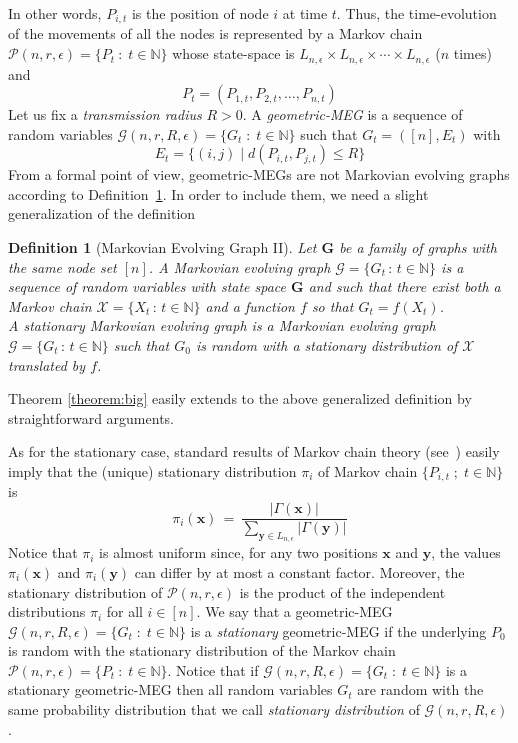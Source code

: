 \documentclass[10pt,a4paper]{article}
\newtheorem{definition}{Definition}[section]
\begin{document}
In other words, $P_{i,t}$ is the position of node $i$ at time $t$. Thus, the time-evolution of the movements of all the nodes is represented by a Markov chain $\mathcal{P}(n, r, \epsilon) = \{P_t \: :\; t\in \mathbb{N} \}$ whose state-space is $L_{n,\epsilon}\times L_{n,\epsilon}\times \cdots \times L_{n,\epsilon}$ ($n$ times) and
$$
P_t  = (P_{1,t}, P_{2,t},\ldots, P_{n, t})
$$
Let us fix a \emph{transmission radius} $R > 0$. A \emph{geometric-MEG} is a sequence of random
variables $\mathcal{G}(n, r, R, \epsilon) = \{ G_t \;:\; t \in \mathbb{N}\}$ such that $G_t = ([n],
E_t)$ with
$$
E_t = \{ (i, j) \;|\; d(P_{i, t}, P_{j, t}) \leqslant R\}
$$
From a formal point of view, geometric-MEGs are not Markovian evolving graphs according to Definition~\ref{def:genmg}. In order to include them, we  need a slight generalization of the definition


\begin{definition}[Markovian Evolving  Graph II]\label{def:genmg}
Let $\mathbf{G}$ be a family of graphs with the same node set $[n]$. A \emph{Markovian evolving  graph} $\mathcal{G} =  \{ G_t \,:\, t \in \mathbb{N} \} $ is a sequence of random variables with state space $\mathbf{G}$ and such that there exist both  a Markov chain $\mathcal{X} =  \{ X_t \,:\, t \in \mathbb{N} \}$ and a function $f$ so that $G_t = f(X_t )$. \\
A \emph{stationary} Markovian evolving  graph is a Markovian evolving graph $\mathcal{G} = \{ G_t \,:\, t \in \mathbb{N} \}$ such that $G_0$ is random with a stationary distribution of $\mathcal{X}$ translated by $f$.
\end{definition}

\noindent Theorem \ref{theorem:big} easily extends to the above generalized definition by straightforward arguments.

\noindent As for the stationary case, standard results of Markov chain theory (see~\cite{AF99}) easily imply that the (unique) stationary distribution $\pi_i$ of Markov chain $\{P_{i,t}\; ;\; t\in\mathbb{N}\}$ is
$$
\pi_i(\mathbf{x}) \, = \, \frac{|\Gamma(\mathbf{x})|}{\sum_{\mathbf{y}\in L_{n,\epsilon}} |\Gamma(\mathbf{y})|}
$$
Notice that $\pi_i$ is almost uniform since, for any two  positions $\mathbf{x}$ and $\mathbf{y}$, the values $\pi_i(\mathbf{x})$ and $\pi_i(\mathbf{y})$ can differ by at most a constant factor. Moreover, the stationary distribution of $\mathcal{P}(n, r, \epsilon)$ is the product of the independent distributions $\pi_i$ for all $i\in [n]$. We say that a geometric-MEG $\mathcal{G}(n, r, R, \epsilon) = \{ G_t \;:\; t \in \mathbb{N}\}$ is a \emph{stationary} geometric-MEG if the underlying $P_0$ is random with the stationary distribution of the Markov chain $\mathcal{P}(n, r, \epsilon) = \{P_t \: :\; t\in \mathbb{N} \}$. Notice that if $\mathcal{G}(n, r, R, \epsilon) = \{ G_t \;:\; t \in \mathbb{N}\}$ is a stationary geometric-MEG then all random variables $G_t$ are random with the same probability distribution that we call \emph{stationary distribution} of $\mathcal{G}(n, r, R, \epsilon)$.
\end{document}
